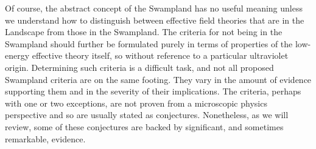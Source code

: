 \documentclass[11pt,a4paper]{article}
\numberwithin{equation}{section}
\numberwithin{table}{section}\setlength{\multlinegap}{25pt}
\begin{document}
Of course, the abstract concept of the Swampland has no useful meaning unless we understand how to distinguish between effective field theories that are in the Landscape from those in the Swampland. The criteria for not being in the Swampland should further be formulated purely in terms of properties of the low-energy effective theory itself, so without reference to a particular ultraviolet origin. Determining such criteria is a difficult task, and not all proposed Swampland criteria are on the same footing. They vary in the amount of evidence supporting them and in the severity of their implications. The criteria, perhaps with one or two exceptions, are not proven from a microscopic physics perspective and so are usually stated as conjectures. Nonetheless, as we will review, some of these conjectures are backed by significant, and sometimes remarkable, evidence. 
\end{document}
